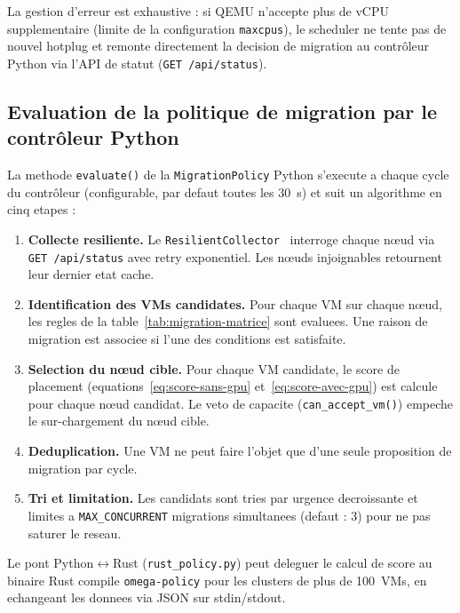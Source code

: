 La gestion d'erreur est exhaustive : si QEMU n'accepte plus de vCPU supplementaire (limite de la configuration \texttt{maxcpus}), le scheduler ne tente pas de nouvel hotplug et remonte directement la decision de migration au contr\^oleur Python via l'API de statut (\texttt{GET /api/status}).

\subsection{Evaluation de la politique de migration par le contr\^oleur Python}
\label{subsec:impl-migration-policy}

La methode \texttt{evaluate()} de la \texttt{MigrationPolicy} Python s'execute a chaque cycle du contr\^oleur (configurable, par defaut toutes les 30~s) et suit un algorithme en cinq etapes :

\begin{enumerate}
    \item \textbf{Collecte resiliente.} Le \texttt{ResilientCollector}~\cite{nygard_release} interroge chaque n\oe{}ud via \texttt{GET /api/status} avec retry exponentiel. Les n\oe{}uds injoignables retournent leur dernier etat cache.
    \item \textbf{Identification des VMs candidates.} Pour chaque VM sur chaque n\oe{}ud, les regles de la table~\ref{tab:migration-matrice} sont evaluees. Une raison de migration est associee si l'une des conditions est satisfaite.
    \item \textbf{Selection du n\oe{}ud cible.} Pour chaque VM candidate, le score de placement (equations~\ref{eq:score-sans-gpu} et~\ref{eq:score-avec-gpu}) est calcule pour chaque n\oe{}ud candidat. Le veto de capacite (\texttt{can\_accept\_vm()}) empeche le sur-chargement du nœud cible.
    \item \textbf{Deduplication.} Une VM ne peut faire l'objet que d'une seule proposition de migration par cycle.
    \item \textbf{Tri et limitation.} Les candidats sont tries par urgence decroissante et limites a \texttt{MAX\_CONCURRENT} migrations simultanees (defaut : 3) pour ne pas saturer le reseau.
\end{enumerate}

Le pont Python$\leftrightarrow$Rust (\texttt{rust\_policy.py}) peut deleguer le calcul de score au binaire Rust compile \texttt{omega-policy} pour les clusters de plus de 100~VMs, en echangeant les donnees via JSON sur stdin/stdout.

